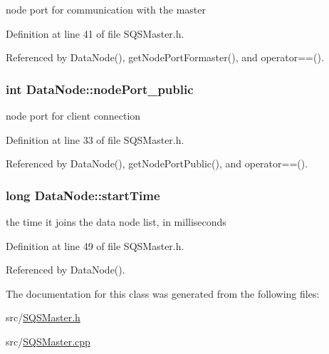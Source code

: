 node port for communication with the master 



\-Definition at line 41 of file \-S\-Q\-S\-Master.\-h.



\-Referenced by \-Data\-Node(), get\-Node\-Port\-Formaster(), and operator==().

\hypertarget{classDataNode_a0cf1261ec432ee38f2fbd3ff4cfff5eb}{
\subsubsection[{node\-Port\-\_\-public}]{\setlength{\rightskip}{0pt plus 5cm}int {\bf \-Data\-Node\-::node\-Port\-\_\-public}}}\label{d7/d25/classDataNode_a0cf1261ec432ee38f2fbd3ff4cfff5eb}


node port for client connection 



\-Definition at line 33 of file \-S\-Q\-S\-Master.\-h.



\-Referenced by \-Data\-Node(), get\-Node\-Port\-Public(), and operator==().

\hypertarget{classDataNode_ae2e3f7f945adb505b53b1e13a2e82bf5}{
\subsubsection[{start\-Time}]{\setlength{\rightskip}{0pt plus 5cm}long {\bf \-Data\-Node\-::start\-Time}}}\label{d7/d25/classDataNode_ae2e3f7f945adb505b53b1e13a2e82bf5}


the time it joins the data node list, in milliseconds 



\-Definition at line 49 of file \-S\-Q\-S\-Master.\-h.



\-Referenced by \-Data\-Node().



\-The documentation for this class was generated from the following files\-:\begin{DoxyCompactItemize}
\item 
src/\hyperlink{SQSMaster_8h}{\-S\-Q\-S\-Master.\-h}\item 
src/\hyperlink{SQSMaster_8cpp}{\-S\-Q\-S\-Master.\-cpp}\end{DoxyCompactItemize}
